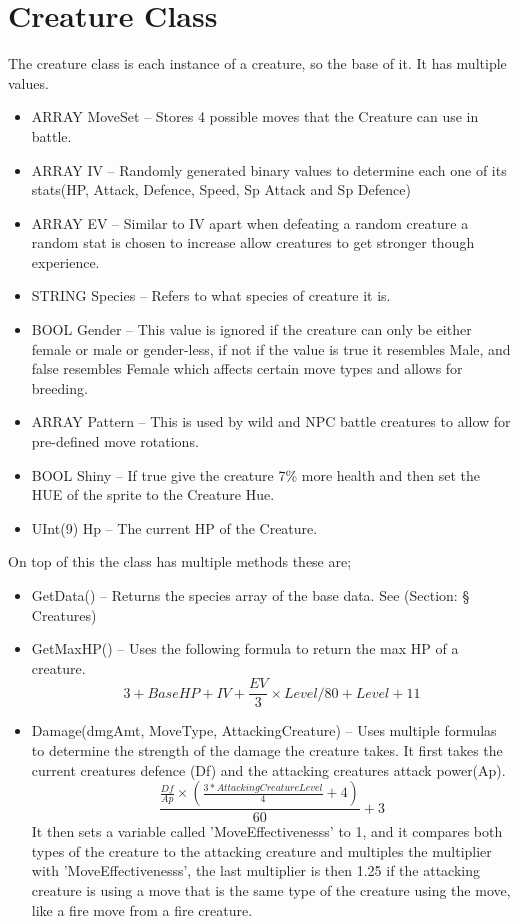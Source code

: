\documentclass[11pt,a4paper]{article}
\begin{document}
\newpage\section{Creature Class} 
The creature class is each instance of a creature, so the base of it. It has multiple values.

\begin{itemize}
\item ARRAY MoveSet -- Stores 4 possible moves that the Creature can use in battle.
\item ARRAY IV -- Randomly generated binary values to determine each one of its stats(HP, Attack,  Defence, Speed, Sp Attack and Sp Defence)
\item ARRAY EV -- Similar to IV apart when defeating a random creature a random stat is chosen to increase allow creatures to get stronger though experience. 
\item STRING Species -- Refers to what species of creature it is.
\item BOOL Gender -- This value is ignored if the creature can only be either female or male or gender-less, if not if the value is true it resembles Male, and false resembles Female which affects certain move types and allows for breeding. 
\item ARRAY Pattern -- This is used by wild and NPC battle creatures to allow for pre-defined move rotations.
\item BOOL Shiny  -- If true give the creature 7\% more health and then set the HUE of the sprite to the Creature Hue.
\item UInt(9) Hp -- The current HP of the Creature.
\end{itemize}

On top of this the class has multiple methods these are;
\begin{itemize}
\item GetData() -- Returns the species array of the base data. See (Section: § Creatures)
\item GetMaxHP() -- Uses the following formula to return the max HP of a creature. $$3+ BaseHP +IV + \frac{EV}{3} \times Level / 80 +Level+11$$
\item Damage(dmgAmt, MoveType, AttackingCreature) -- Uses multiple formulas to determine the strength of the damage the creature takes.  It first takes the current creatures defence (Df) and the attacking creatures attack power(Ap).
$$\frac{\frac{Df}{Ap} \times (\frac{3 *AttackingCreatureLevel}{4} + 4)}{60} + 3
$$ It then sets a variable called 'MoveEffectivenesss' to 1, and it compares both types of the creature to the attacking creature and multiples the multiplier with 'MoveEffectivenesss', the last multiplier is then 1.25 if the attacking creature is using a move that is the same type of the creature using the move, like a fire move from a fire creature.
\end{itemize}
\end{document}
